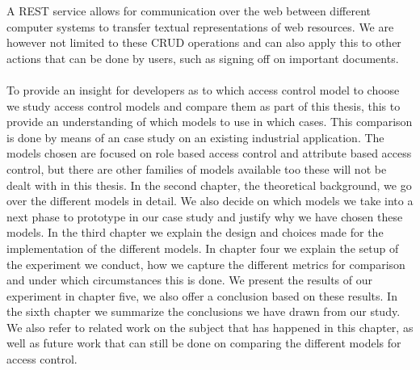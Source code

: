 A REST service allows for communication over the web between different computer systems to transfer textual representations of web resources.
We are however not limited to these CRUD operations and can also apply this to other actions that can be done by users, such as signing off on important documents.
\\
\\
To provide an insight for developers as to which access control model to choose we study access control models and compare them as part of this thesis, this to provide an understanding of which models to use in which cases.
This comparison is done by means of an case study on an existing industrial application.
The models chosen are focused on role based access control and attribute based access control, but there are other families of models available too these will not be dealt with in this thesis.
In the second chapter, the theoretical background, we go over the different models in detail.
We also decide on which models we take into a next phase to prototype in our case study and justify why we have chosen these models.
In the third chapter we explain the design and choices made for the implementation of the different models.
In chapter four we explain the setup of the experiment we conduct, how we capture the different metrics for comparison and under which circumstances this is done.
We present the results of our experiment in chapter five, we also offer a conclusion based on these results.
In the sixth chapter we summarize the conclusions we have drawn from our study.
We also refer to related work on the subject that has happened in this chapter, as well as future work that can still be done on comparing the different models for access control.
